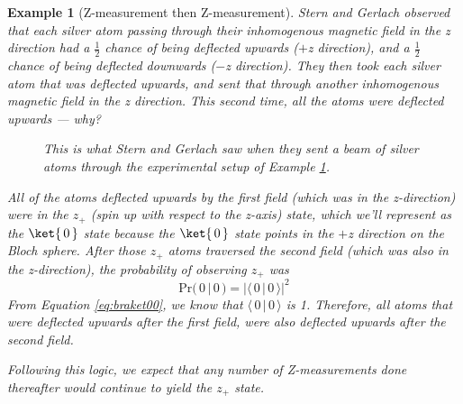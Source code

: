 \documentclass{article}
\newtheorem{example}{Example}
\newcommand{\abs}[1]{{\big\vert} #1 {\big\vert}}
\newcommand{\kz}[1]{\ket{\,#1\,}}
\begin{document}
\begin{example}[Z-measurement then Z-measurement] \label{example:sterngerlachzz}
Stern and Gerlach observed that each silver atom passing through their inhomogenous magnetic field in the z direction had a $\frac{1}{2}$ chance of being deflected upwards ($+$z direction), and a $\frac{1}{2}$ chance of being deflected downwards ($-$z direction).  They then took each silver atom that was deflected upwards, and sent that through another inhomogenous magnetic field in the z direction.  This second time, all the atoms were deflected upwards --- why?

\begin{figure}[h!]
	\caption{This is what Stern and Gerlach saw when they sent a beam of silver atoms through the experimental setup of Example \ref{example:sterngerlachzz}.}
\end{figure}

\textnormal{All of the atoms deflected upwards by the first field (which was in the z-direction) were in the $z_+$ (spin up with respect to the z-axis) state, which we'll represent as the $\kz0$ state because the $\kz0$ state points in the $+$z direction on the Bloch sphere.  After those $z_+$ atoms traversed the second field (which was also in the z-direction), the probability of observing $z_+$ was \begin{equation}
	\text{Pr}(\,0\,|\,0\,) = \abs{\langle\,0\,|\,0\,\rangle}^2
\end{equation}
From Equation \ref{eq:braket00}, we know that $\langle\,0\,|\,0\,\rangle$ is 1.  Therefore, all atoms that were deflected upwards after the first field, were also deflected upwards after the second field.}

\textnormal{Following this logic, we expect that any number of Z-measurements done thereafter would continue to yield the $z_+$ state.}
\end{example}
\end{document}
